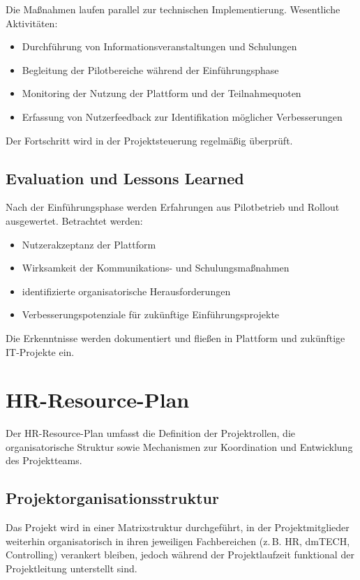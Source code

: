 Die Maßnahmen laufen parallel zur technischen Implementierung. Wesentliche Aktivitäten:

\begin{itemize}
    \item Durchführung von Informationsveranstaltungen und Schulungen
    \item Begleitung der Pilotbereiche während der Einführungsphase
    \item Monitoring der Nutzung der Plattform und der Teilnahmequoten
    \item Erfassung von Nutzerfeedback zur Identifikation möglicher Verbesserungen
\end{itemize}

Der Fortschritt wird in der Projektsteuerung regelmäßig überprüft.

\subsection{Evaluation und Lessons Learned}

Nach der Einführungsphase werden Erfahrungen aus Pilotbetrieb und Rollout ausgewertet. Betrachtet werden:

\begin{itemize}
    \item Nutzerakzeptanz der Plattform
    \item Wirksamkeit der Kommunikations- und Schulungsmaßnahmen
    \item identifizierte organisatorische Herausforderungen
    \item Verbesserungspotenziale für zukünftige Einführungsprojekte
\end{itemize}

Die Erkenntnisse werden dokumentiert und fließen in Plattform und zukünftige \ac{IT}-Projekte ein.

\section{HR-Resource-Plan}

Der HR-Resource-Plan umfasst die Definition der Projektrollen, die
organisatorische Struktur sowie Mechanismen zur Koordination und
Entwicklung des Projektteams.

\subsection{Projektorganisationsstruktur}

Das Projekt wird in einer Matrixstruktur durchgeführt, in der
Projektmitglieder weiterhin organisatorisch in ihren jeweiligen
Fachbereichen (z.\,B. HR, dmTECH, Controlling) verankert bleiben,
jedoch während der Projektlaufzeit funktional der Projektleitung
unterstellt sind.

